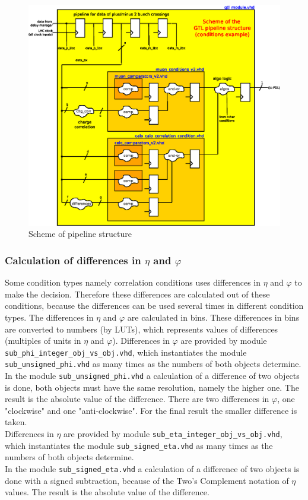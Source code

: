 \begin{figure}[htb]
\centering
\includegraphics[width=15cm]{figures/gtl_pipeline}
\caption{Scheme of \ugtl pipeline structure} 
\label{fig:gtl:gtl_pipeline}
\end{figure}

\subsubsection{Calculation of differences in $\eta$ and $\varphi$}
\label{sec:gtl:calculation_differences}

Some condition types namely correlation conditions uses differences in $\eta$ and $\varphi$ to make the decision.
Therefore these differences are calculated out of these conditions, because the differences can be used several times in different condition types.
The differences in $\eta$ and $\varphi$ are calculated in bins. These differences in bins are converted to numbers (by LUTs),
which represents values of differences (multiples of units in $\eta$ and $\varphi$).
Differences in $\varphi$ are provided by module \texttt{sub\_phi\_integer\_obj\_vs\_obj.vhd}, which instantiates the module \texttt{sub\_unsigned\_phi.vhd} as many times as
the numbers of both objects determine.\\
In the module \texttt{sub\_unsigned\_phi.vhd} a calculation of a difference of two objects is done, both objects must have the same resolution, namely the higher one.
The result is the absolute value of the difference.
There are two differences in $\varphi$, one "clockwise" and one "anti-clockwise". For the final result the smaller difference is taken.\\
Differences in $\eta$ are provided by module \texttt{sub\_eta\_integer\_obj\_vs\_obj.vhd}, which instantiates the module \texttt{sub\_signed\_eta.vhd} as many times as
the numbers of both objects determine.\\
In the module \texttt{sub\_signed\_eta.vhd} a calculation of a difference of two objects is done with a signed subtraction, because of the Two's Complement notation of $\eta$ values.
The result is the absolute value of the difference. 


